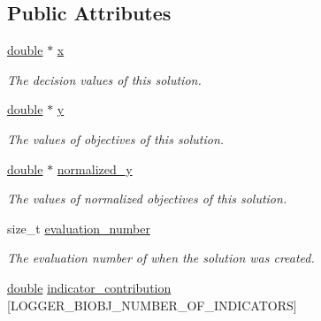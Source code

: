 \subsection*{Public Attributes}
\begin{DoxyCompactItemize}
\item 
\hyperlink{classdouble}{double} $\ast$ \hyperlink{structlogger__biobj__avl__item__t_a2178cdb5f19d0ff82f67adeb31b2f06e}{x}\hypertarget{structlogger__biobj__avl__item__t_a2178cdb5f19d0ff82f67adeb31b2f06e}{}\label{structlogger__biobj__avl__item__t_a2178cdb5f19d0ff82f67adeb31b2f06e}

\begin{DoxyCompactList}\small\item\em The decision values of this solution. \end{DoxyCompactList}\item 
\hyperlink{classdouble}{double} $\ast$ \hyperlink{structlogger__biobj__avl__item__t_a55ebebec37d322d3d435512133b94a8c}{y}\hypertarget{structlogger__biobj__avl__item__t_a55ebebec37d322d3d435512133b94a8c}{}\label{structlogger__biobj__avl__item__t_a55ebebec37d322d3d435512133b94a8c}

\begin{DoxyCompactList}\small\item\em The values of objectives of this solution. \end{DoxyCompactList}\item 
\hyperlink{classdouble}{double} $\ast$ \hyperlink{structlogger__biobj__avl__item__t_a91038761c0ace28a8f6a0b0c8938676b}{normalized\+\_\+y}\hypertarget{structlogger__biobj__avl__item__t_a91038761c0ace28a8f6a0b0c8938676b}{}\label{structlogger__biobj__avl__item__t_a91038761c0ace28a8f6a0b0c8938676b}

\begin{DoxyCompactList}\small\item\em The values of normalized objectives of this solution. \end{DoxyCompactList}\item 
size\+\_\+t \hyperlink{structlogger__biobj__avl__item__t_aeb1a86abf93e75aa864d7d72aef42466}{evaluation\+\_\+number}\hypertarget{structlogger__biobj__avl__item__t_aeb1a86abf93e75aa864d7d72aef42466}{}\label{structlogger__biobj__avl__item__t_aeb1a86abf93e75aa864d7d72aef42466}

\begin{DoxyCompactList}\small\item\em The evaluation number of when the solution was created. \end{DoxyCompactList}\item 
\hyperlink{classdouble}{double} \hyperlink{structlogger__biobj__avl__item__t_a3d8ba81323eb745aee2d8d7bc08f7c37}{indicator\+\_\+contribution} \mbox{[}L\+O\+G\+G\+E\+R\+\_\+\+B\+I\+O\+B\+J\+\_\+\+N\+U\+M\+B\+E\+R\+\_\+\+O\+F\+\_\+\+I\+N\+D\+I\+C\+A\+T\+O\+RS\mbox{]}\hypertarget{structlogger__biobj__avl__item__t_a3d8ba81323eb745aee2d8d7bc08f7c37}{}\label{structlogger__biobj__avl__item__t_a3d8ba81323eb745aee2d8d7bc08f7c37}


\end{DoxyCompactItemize}
